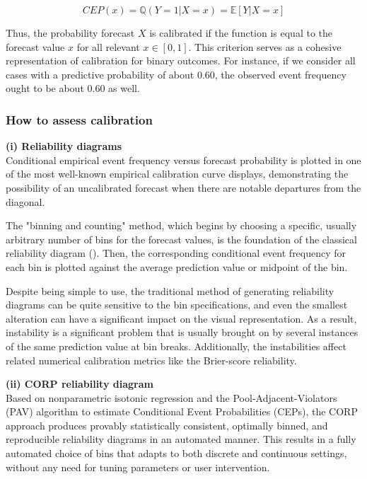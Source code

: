 \documentclass[a4paper,12pt]{article}
\numberwithin{equation}{section}
\begin{document}
      \begin{equation} \label{eq: calibration} 
      CEP(x) = \mathbb{Q}(Y = 1 | X = x) = \mathbb{E}[Y | X = x]
      \end{equation}

      Thus, the probability forecast $X$ is calibrated if the function is equal to the forecast value $x$ for all relevant $x \in [0, 1]$. This criterion serves as a cohesive representation of calibration for binary outcomes. For instance, if we consider all cases with a predictive probability of about 0.60, the observed event frequency ought to be about 0.60 as well.

      \subsubsection{How to assess calibration}
      {\bf (i) Reliability diagrams\\}
      Conditional empirical event frequency versus forecast probability is plotted in one of the most well-known empirical calibration curve displays, demonstrating the possibility of an uncalibrated forecast when there are notable departures from the diagonal.\bigskip

      The "binning and counting" method, which begins by choosing a specific, usually arbitrary number of bins for the forecast values, is the foundation of the classical reliability diagram (\cite{reliability1}). Then, the corresponding conditional event frequency for each bin is plotted against the average prediction value or midpoint of the bin. \bigskip
      
      Despite being simple to use, the traditional method of generating reliability diagrams can be quite sensitive to the bin specifications, and even the smallest alteration can have a significant impact on the visual representation. As a result, instability is a significant problem that is usually brought on by several instances of the same prediction value at bin breaks. Additionally, the instabilities affect related numerical calibration metrics like the Brier-score reliability.\bigskip

      {\bf (ii) CORP reliability diagram\\}
      Based on nonparametric isotonic regression and the Pool-Adjacent-Violators (PAV) algorithm to estimate Conditional Event Probabilities (CEPs), the CORP approach produces provably statistically consistent, optimally binned, and reproducible reliability diagrams in an automated manner. This results in a fully automated choice of bins that adapts to both discrete and continuous settings, without any need for tuning parameters or user intervention.\bigskip
\end{document}
